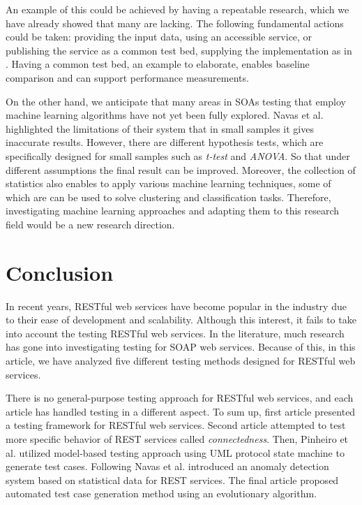 \documentclass[english]{tktltiki}
\begin{document}
An example of this could be achieved by having a repeatable research, which we have already showed that many are lacking. The following fundamental actions could be taken: providing the input data, using an accessible service, or publishing the service as a common test bed, supplying the implementation as in \cite{arcuri2017restful}. Having a common test bed, an example to elaborate, enables baseline comparison and can support performance measurements.

On the other hand, we anticipate that many areas in SOAs testing that employ machine learning algorithms have not yet been fully explored. Navas et al. \cite{navas2014rest} highlighted the limitations of their system that in small samples it gives inaccurate results. However, there are different hypothesis tests, which are specifically designed for small samples such as \textit{t-test} and \textit{ANOVA}. So that under different assumptions the final result can be improved. Moreover, the collection of statistics also enables to apply various machine learning techniques, some of which are can be used to solve clustering and classification tasks. Therefore, investigating machine learning approaches and adapting them to this research field would be a new research direction.

\section{Conclusion}
In recent years, RESTful web services have become popular in the industry due to their ease of development and scalability. Although this interest, it fails to take into account the testing RESTful web services. In the literature, much research has gone into investigating testing for SOAP web services. Because of this, in this article, we have analyzed five different testing methods designed for RESTful web services.

There is no general-purpose testing approach for RESTful web services, and each article has handled testing in a different aspect. To sum up, first article \cite{chakrabarti2010connectedness} presented a testing framework for RESTful web services. Second article \cite{chakrabarti2010connectedness} attempted to test more specific behavior of REST services called \textit{connectedness}. Then, Pinheiro et al. \cite{pinheiro2013model} utilized model-based testing approach using UML protocol state machine to generate test cases. Following Navas et al. \cite{navas2014rest} introduced an anomaly detection system based on statistical data for REST services. The final article \cite{arcuri2017restful} proposed automated test case generation method using an evolutionary algorithm.
\end{document}
